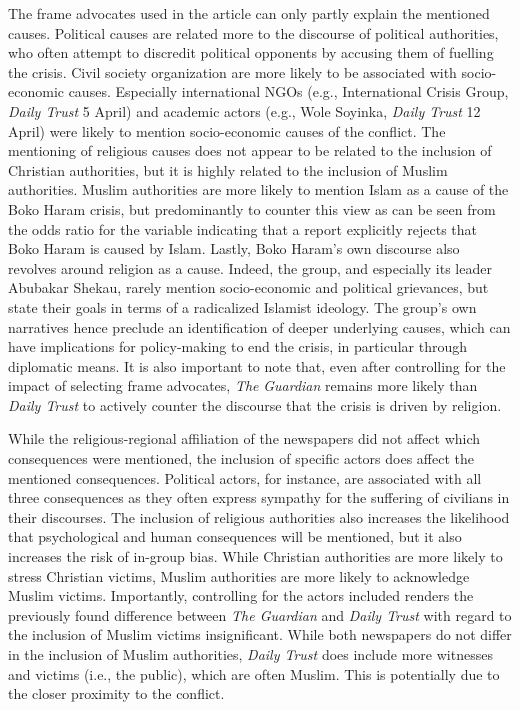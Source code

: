 \newpage


The frame advocates used in the article can only partly explain the mentioned causes. Political causes are related more to the discourse of political authorities, who often attempt to discredit political opponents by accusing them of fuelling the crisis. Civil society organization are more likely to be associated with socio-economic causes. Especially international NGOs (e.g., International Crisis Group, \textit{Daily Trust} 5 April) and academic actors (e.g., Wole Soyinka, \textit{Daily Trust} 12 April) were likely to mention socio-economic causes of the conflict. The mentioning of religious causes does not appear to be related to the inclusion of Christian authorities, but it is highly related to the inclusion of Muslim authorities. Muslim authorities are more likely to mention Islam as a cause of the Boko Haram crisis, but predominantly to counter this view as can be seen from the odds ratio for the variable indicating that a report explicitly rejects that Boko Haram is caused by Islam. Lastly, Boko Haram's own discourse also revolves around religion as a cause. Indeed, the group, and especially its leader Abubakar Shekau, rarely mention socio-economic and political grievances, but state their goals in terms of a radicalized Islamist ideology. The group's own narratives hence preclude an identification of deeper underlying causes, which can have implications for policy-making to end the crisis, in particular through diplomatic means. It is also important to note that, even after controlling for the impact of selecting frame advocates, \textit{The} \textit{Guardian} remains more likely than \textit{Daily Trust} to actively counter the discourse that the crisis is driven by religion.


While the religious-regional affiliation of the newspapers did not affect which consequences were mentioned, the inclusion of specific actors does affect the mentioned consequences. Political actors, for instance, are associated with all three consequences as they often express sympathy for the suffering of civilians in their discourses. The inclusion of religious authorities also increases the likelihood that psychological and human consequences will be mentioned, but it also increases the risk of in-group bias. While Christian authorities are more likely to stress Christian victims, Muslim authorities are more likely to acknowledge Muslim victims. Importantly, controlling for the actors included renders the previously found difference between \textit{The Guardian }and \textit{Daily Trust} with regard to the inclusion of Muslim victims insignificant. While both newspapers do not differ in the inclusion of Muslim authorities, \textit{Daily Trust} does include more witnesses and victims (i.e., the public), which are often Muslim. This is potentially due to the closer proximity to the conflict.


